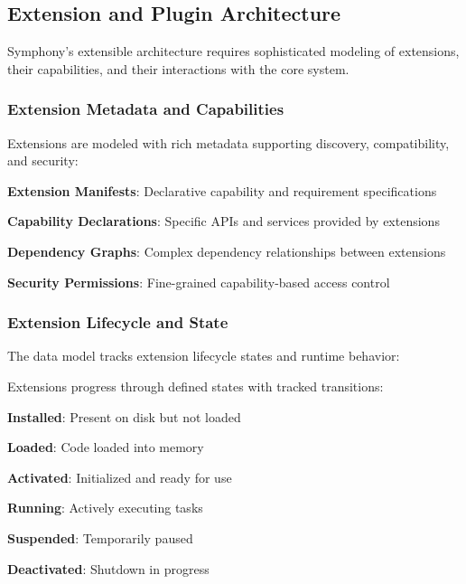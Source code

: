 \subsection*{Extension and Plugin Architecture}

Symphony's extensible architecture requires sophisticated modeling of extensions, their capabilities, and their interactions with the core system.

\subsubsection*{Extension Metadata and Capabilities}

Extensions are modeled with rich metadata supporting discovery, compatibility, and security:

\begin{compactlist}
    \item \textbf{Extension Manifests}: Declarative capability and requirement specifications
    \item \textbf{Capability Declarations}: Specific APIs and services provided by extensions
    \item \textbf{Dependency Graphs}: Complex dependency relationships between extensions
    \item \textbf{Security Permissions}: Fine-grained capability-based access control
\end{compactlist}

\subsubsection*{Extension Lifecycle and State}

The data model tracks extension lifecycle states and runtime behavior:

\begin{infobox}[title=Extension State Machine]
Extensions progress through defined states with tracked transitions:
\begin{compactlist}
    \item \textbf{Installed}: Present on disk but not loaded
    \item \textbf{Loaded}: Code loaded into memory
    \item \textbf{Activated}: Initialized and ready for use
    \item \textbf{Running}: Actively executing tasks
    \item \textbf{Suspended}: Temporarily paused
    \item \textbf{Deactivated}: Shutdown in progress
\end{compactlist}
\end{infobox}

